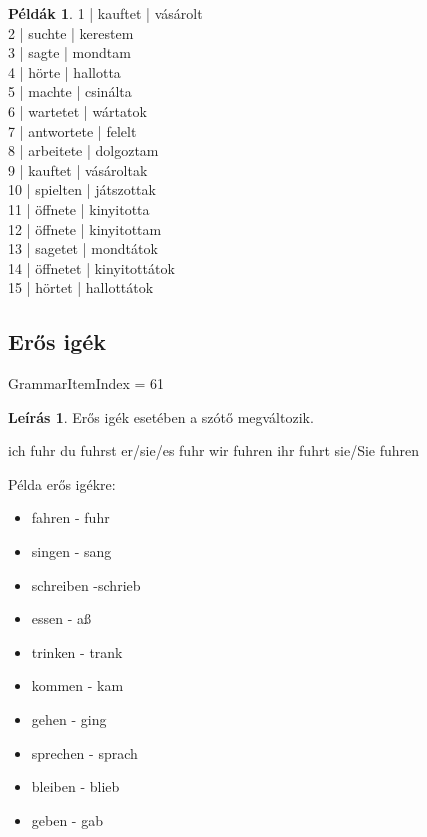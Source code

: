 \documentclass{article}
\theoremstyle{definition}
\newtheorem*{exmp}{Példák}
\newtheorem*{desc}{Leírás}
\begin{document}
\begin{exmp}	%
1 | kauftet | vásárolt\\
2 | suchte | kerestem\\
3 | sagte | mondtam\\
4 | hörte | hallotta\\
5 | machte | csinálta\\
6 | wartetet | wártatok\\
7 | antwortete | felelt\\
8 | arbeitete | dolgoztam\\
9 | kauftet | vásároltak\\
10 | spielten | játszottak\\
11 | öffnete | kinyitotta\\
12 | öffnete | kinyitottam\\
13 | sagetet | mondtátok\\
14 | öffnetet | kinyitottátok\\
15 | hörtet | hallottátok\\
\end{exmp}

\subsection{Erős igék}

GrammarItemIndex = 61

\begin{desc}
Erős igék esetében a szótő megváltozik.

ich fuhr
du fuhrst
er/sie/es fuhr
wir fuhren
ihr fuhrt
sie/Sie fuhren

Példa erős igékre:
\begin{itemize}
\item fahren - fuhr
\item singen - sang
\item schreiben -schrieb
\item essen - aß
\item trinken - trank
\item kommen - kam
\item gehen - ging
\item sprechen - sprach
\item bleiben - blieb
\item geben - gab
\end{itemize}
\end{desc}
\end{document}
